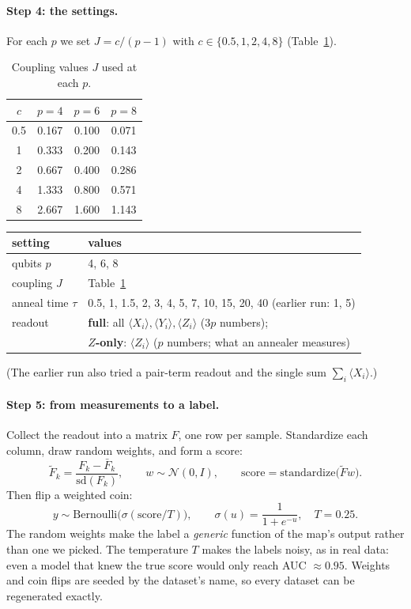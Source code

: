\documentclass[11pt]{article}
\begin{document}
\paragraph{Step 4: the settings.} For each $p$ we set $J=c/(p-1)$ with $c\in\{0.5,1,2,4,8\}$
(Table~\ref{tab:J}).
\begin{table}[H]\centering\small
\caption{Coupling values $J$ used at each $p$.}\label{tab:J}
\begin{tabular}{@{}cccc@{}}\toprule
$c$ & $p=4$ & $p=6$ & $p=8$\\\midrule
0.5 & 0.167 & 0.100 & 0.071\\
1 & 0.333 & 0.200 & 0.143\\
2 & 0.667 & 0.400 & 0.286\\
4 & 1.333 & 0.800 & 0.571\\
8 & 2.667 & 1.600 & 1.143\\\bottomrule
\end{tabular}
\end{table}

\begin{center}\small
\begin{tabular}{@{}ll@{}}\toprule
setting & values\\\midrule
qubits $p$ & 4, 6, 8\\
coupling $J$ & Table~\ref{tab:J}\\
anneal time $\tau$ & 0.5, 1, 1.5, 2, 3, 4, 5, 7, 10, 15, 20, 40 \quad (earlier run: 1, 5)\\
readout & \textbf{full}: all $\langle X_i\rangle,\langle Y_i\rangle,\langle Z_i\rangle$ ($3p$ numbers);\\
        & \textbf{$Z$-only}: $\langle Z_i\rangle$ ($p$ numbers; what an annealer measures)\\\bottomrule
\end{tabular}
\end{center}
(The earlier run also tried a pair-term readout and the single sum $\sum_i\langle X_i\rangle$.)

\paragraph{Step 5: from measurements to a label.} Collect the readout into a matrix $F$, one row per sample.
Standardize each column, draw random weights, and form a score:
\begin{equation}
\tilde F_k=\frac{F_k-\bar F_k}{\mathrm{sd}(F_k)},\qquad w\sim\mathcal N(0,I),\qquad
\mathrm{score}=\mathrm{standardize}\big(\tilde F w\big).
\end{equation}
Then flip a weighted coin:
\begin{equation}
y\sim\mathrm{Bernoulli}\big(\sigma(\mathrm{score}/T)\big),\qquad \sigma(u)=\frac{1}{1+e^{-u}},\quad T=0.25 .
\end{equation}
The random weights make the label a \emph{generic} function of the map's output rather than one we picked.
The temperature $T$ makes the labels noisy, as in real data: even a model that knew the true score would only
reach AUC $\approx0.95$. Weights and coin flips are seeded by the dataset's name, so every dataset can be
regenerated exactly.
\end{document}
